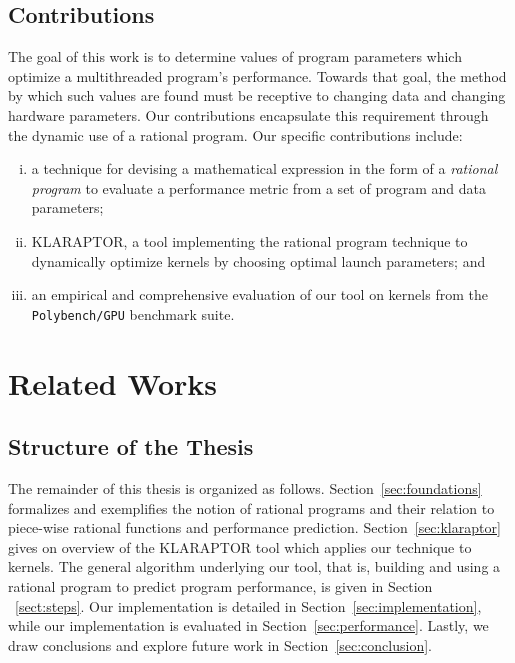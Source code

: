 \subsection{Contributions}

The goal of this work is to determine values of program parameters which
optimize a multithreaded program's performance.  Towards that goal,
the method by which such values are found must be
receptive to changing data and changing  hardware parameters. Our contributions
encapsulate this requirement through the dynamic use of a rational
program.  Our specific contributions include:
\begin{enumerate}[(i)]
	\item a technique for devising a mathematical expression in the form of a {\em rational program} to evaluate a performance metric from a set of program and data parameters;
	\item KLARAPTOR, a tool implementing the rational program technique to dynamically optimize {\cuda} kernels by choosing optimal launch parameters; and
	\item an empirical and comprehensive evaluation of our tool on kernels from the \texttt{Polybench/GPU} benchmark suite.
\end{enumerate}

\fi



\section{Related Works}

\label{sec:relatedworks}



\iffalse
\subsection{Structure of the Thesis}

The remainder of this thesis is organized as follows.
Section~\ref{sec:foundations} formalizes and exemplifies the notion of rational programs
and their relation to piece-wise rational functions and performance prediction.
Section~\ref{sec:klaraptor} gives on overview of the KLARAPTOR tool
which applies our technique to {\cuda} kernels.
The general algorithm underlying our tool, that is, 
building and using a rational program to predict program performance, 
is given in Section ~\ref{sect:steps}.
Our implementation is detailed in Section~\ref{sec:implementation},
while our implementation is evaluated
in Section~\ref{sec:performance}.
Lastly, we draw conclusions and explore future work in Section~\ref{sec:conclusion}.

